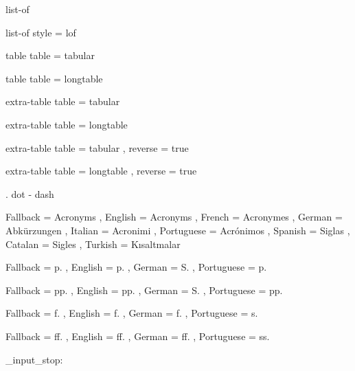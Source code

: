  {list-of}
  { }

 {list-of}
  { style = lof }

 {table}
  { table = tabular }

 {table}
  { table = longtable }

 {extra-table}
  { table = tabular }

 {extra-table}
  { table = longtable }

 {extra-table}
  {
    table   = tabular ,
    reverse = true
  }

 {extra-table}
  {
    table   = longtable ,
    reverse = true
  }

\AcroRegisterTrailing . {dot}
\AcroRegisterTrailing - {dash}
\AcroRegisterTrailing {}


  {
    Fallback   = Acronyms ,
    English    = Acronyms ,
    French     = Acronymes ,
    German     = Abk\"urzungen ,
    Italian    = Acronimi ,
    Portuguese = Acr\'onimos ,
    Spanish    = Siglas ,
    Catalan    = Sigles ,
    Turkish    = K\i saltmalar
  }

  {
    Fallback   = p. ,
    English    = p. ,
    German     = S. ,
    Portuguese = p.
  }

  {
    Fallback   = pp. ,
    English    = pp. ,
    German     = S. ,
    Portuguese = pp.
  }

  {
    Fallback   = f. ,
    English    = f. ,
    German     = f. ,
    Portuguese = s.
  }

  {
    Fallback   = ff. ,
    English    = ff. ,
    German     = ff. ,
    Portuguese = ss.
  }

\file_input_stop:
